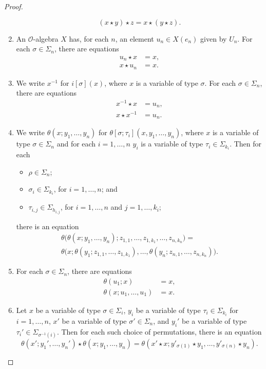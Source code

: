 \begin{proof}
\begin{enumerate}
\[
(x \star y) \star z = x \star (y \star z).
\]
\item An $\mathcal{O}$-algebra $X$ has, for each $n$, an element $u_n \in X(e_n)$ given by $U_n$. For each $\sigma \in \Sigma_n$, there are equations
\begin{align*}
u_n \star x & = x,\\
x \star u_n & = x.
\end{align*}
\item We write $x^{-1}$ for $i[\sigma](x)$, where $x$ is a variable of type $\sigma$. For each $\sigma \in \Sigma_n$, there are equations
\begin{align*}
x^{-1} \star x & = u_n,\\
x \star x^{-1} & = u_n.
\end{align*}
\item We write $\theta(x; y_1, \ldots, y_n)$ for $\theta[\sigma; \tau_i](x, y_1, \ldots, y_n)$, where $x$ is a variable of type $\sigma \in \Sigma_n$ and for each $i= 1, \ldots, n$ $y_i$ is a variable of type $\tau_i \in \Sigma_{k_i}$. Then for each 
\begin{itemize}
\item $\rho \in \Sigma_n$;
\item $\sigma_i \in \Sigma_{k_i}$, for $i= 1, \ldots, n$; and
\item $\tau_{i,j} \in \Sigma_{h_{i,j}}$, for $i=1, \ldots, n$ and $j=1, \ldots, k_i$;
\end{itemize}
there is an equation
\begin{multline*}
\theta\big( \theta(x; y_1, \ldots, y_n); z_{1,1}, \ldots, z_{1, k_1}, \ldots, z_{n, k_n} \big) = \\ \theta\big( x; \theta(y_1; z_{1,1}, \ldots, z_{1, k_1}), \ldots, \theta(y_n; z_{n, 1}, \ldots, z_{n, k_n}) \big).
\end{multline*}
\item For each $\sigma \in \Sigma_n$, there are equations
\begin{align*}
\theta(u_1; x)& = x, \\
\theta(x; u_1, \ldots, u_1) & = x.
\end{align*}
\item Let $x$ be a variable of type $\sigma \in \Sigma_i$, $y_i$ be a variable of type $\tau_i \in \Sigma_{k_i}$ for $i=1, \ldots, n$, $x'$ be a variable of type $\sigma' \in \Sigma_n$, and $y_i'$ be a variable of type $\tau_i' \in \Sigma_{\sigma^{-1}(i)}$. Then for each such choice of permutations, there is an equation
\[
\theta(x'; y_1', \ldots, y_n') \star \theta(x; y_1, \ldots, y_n) = \theta(x' \star x; y'_{\sigma(1)} \star y_1, \ldots, y'_{\sigma(n)} \star y_n).
\]
\end{enumerate}


\end{proof}
